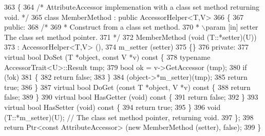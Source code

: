 \begin{DoxyCode}
363 \{
364   \textcolor{comment}{/* AttributeAccessor implemenation with a class set method returning void. */}
365   \textcolor{keyword}{class }MemberMethod : \textcolor{keyword}{public} AccessorHelper<T,V>
366   \{
367 \textcolor{keyword}{public}:
368     \textcolor{comment}{/*}
369 \textcolor{comment}{     * Construct from a class set method.}
370 \textcolor{comment}{     * \(\backslash\)param [in] setter The class set method pointer.}
371 \textcolor{comment}{     */}
372     MemberMethod (\textcolor{keywordtype}{void} (T::*setter)(U))
373       : AccessorHelper<T,V> (),
374         m\_setter (setter)
375     \{\}
376 \textcolor{keyword}{private}:
377     \textcolor{keyword}{virtual} \textcolor{keywordtype}{bool} DoSet (T *\textcolor{keywordtype}{object}, \textcolor{keyword}{const} V *v)\textcolor{keyword}{ const }\{
378       \textcolor{keyword}{typename} AccessorTrait<U>::Result tmp;
379       \textcolor{keywordtype}{bool} ok = v->GetAccessor (tmp);
380       \textcolor{keywordflow}{if} (!ok)
381         \{
382           \textcolor{keywordflow}{return} \textcolor{keyword}{false};
383         \}
384       (\textcolor{keywordtype}{object}->*m\_setter)(tmp);
385       \textcolor{keywordflow}{return} \textcolor{keyword}{true};
386     \}
387     \textcolor{keyword}{virtual} \textcolor{keywordtype}{bool} DoGet (\textcolor{keyword}{const} T *\textcolor{keywordtype}{object}, V *v)\textcolor{keyword}{ const }\{
388       \textcolor{keywordflow}{return} \textcolor{keyword}{false};
389     \}
390     \textcolor{keyword}{virtual} \textcolor{keywordtype}{bool} HasGetter (\textcolor{keywordtype}{void})\textcolor{keyword}{ const }\{
391       \textcolor{keywordflow}{return} \textcolor{keyword}{false};
392     \}
393     \textcolor{keyword}{virtual} \textcolor{keywordtype}{bool} HasSetter (\textcolor{keywordtype}{void})\textcolor{keyword}{ const }\{
394       \textcolor{keywordflow}{return} \textcolor{keyword}{true};
395     \}
396     void (T::*m\_setter)(U);  \textcolor{comment}{// The class set method pointer, returning void.}
397   \};
398   \textcolor{keywordflow}{return} Ptr<const AttributeAccessor> (\textcolor{keyword}{new} MemberMethod (setter), \textcolor{keyword}{false});
399 \}
\end{DoxyCode}

